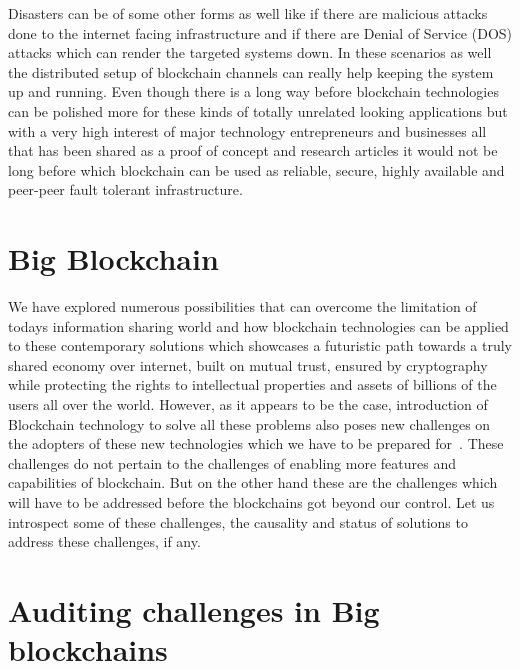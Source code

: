 Disasters can be of some other forms as well like if there are
malicious attacks done to the internet facing infrastructure and if
there are Denial of Service (DOS) attacks which can render the
targeted systems down. In these scenarios as well the distributed
setup of blockchain channels can really help keeping the system up and
running. Even though there is a long way before blockchain technologies
can be polished more for these kinds of totally unrelated looking
applications but with a very high interest of major technology
entrepreneurs and businesses all that has been shared as a proof of
concept and research articles it would not be long before which
blockchain can be used as reliable, secure, highly available and
peer-peer fault tolerant infrastructure.


\section{Big Blockchain}

We have explored numerous possibilities that can overcome the
limitation of todays information sharing world and how blockchain
technologies can be applied to these contemporary solutions which
showcases a futuristic path towards a truly shared economy over
internet, built on mutual trust, ensured by cryptography while
protecting the rights to intellectual properties and assets of
billions of the users all over the world. However, as it appears to be
the case, introduction of Blockchain technology to solve all these
problems also poses new challenges on the adopters of these new
technologies which we have to be prepared for~\cite{smith31}. These
challenges do not pertain to the challenges of enabling more features
and capabilities of blockchain. But on the other hand these are the
challenges which will have to be addressed before the blockchains got
beyond our control. Let us introspect some of these challenges, the
causality and status of solutions to address these challenges, if any.

\section{Auditing challenges in Big blockchains}

